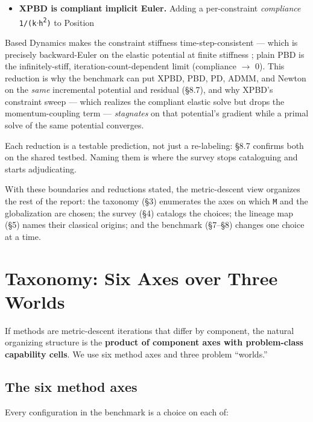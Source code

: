 \documentclass{egpubl}
\begin{document}
\begin{itemize}
  \item \textbf{XPBD is compliant implicit Euler.} Adding a per-constraint \emph{compliance} \texttt{1/(k$\cdot$h\textsuperscript{2})} to Position
\end{itemize}
  Based Dynamics makes the constraint stiffness time-step-consistent --- which is precisely
  backward-Euler on the elastic potential at finite stiffness \cite{xpbd}; plain PBD is the
  infinitely-stiff, iteration-count-dependent limit (compliance $\rightarrow$ 0). This reduction is why the
  benchmark can put XPBD, PBD, PD, ADMM, and Newton on the \emph{same} incremental potential and residual
  (\S8.7), and why XPBD's constraint sweep --- which realizes the compliant elastic solve but drops the
  momentum-coupling term --- \emph{stagnates} on that potential's gradient while a primal solve of the same
  potential converges.

Each reduction is a testable prediction, not just a re-labeling: \S8.7 confirms both on the shared
testbed. Naming them is where the survey stops cataloguing and starts adjudicating.

With these boundaries and reductions stated, the metric-descent view organizes the rest of the report:
the taxonomy (\S3) enumerates the axes on which \texttt{M} and the globalization are chosen; the survey (\S4)
catalogs the choices; the lineage map (\S5) names their classical origins; and the benchmark (\S7--\S8)
changes one choice at a time.


\section{Taxonomy: Six Axes over Three Worlds}

If methods are metric-descent iterations that differ by component, the natural organizing structure is
the \textbf{product of component axes with problem-class capability cells}. We use six method axes and
three problem ``worlds.''

\subsection{The six method axes}

Every configuration in the benchmark is a choice on each of:
\end{document}
